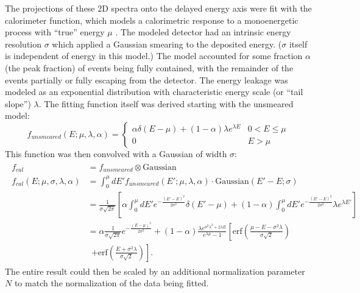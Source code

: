 The projections of these 2D spectra onto the delayed energy axis
were fit with the calorimeter function, which models
a calorimetric response to a monoenergetic process with ``true''
energy $\mu$ \cite{calorimeter2016}.
The modeled detector had an intrinsic energy resolution $\sigma$
which applied a Gaussian smearing to the deposited energy.
($\sigma$ itself is independent of energy in this model.)
The model accounted for some fraction $\alpha$ (the peak fraction)
of events being fully contained,
with the remainder of the events partially or fully escaping from the detector.
The energy leakage was modeled as an exponential distribution
with characteristic energy scale (or ``tail slope'') $\lambda$.
The fitting function itself was derived starting with
the unsmeared model:
\begin{equation}
    f_{unsmeared}(E;\mu,\lambda,\alpha) =
    \begin{cases}
        \alpha\delta(E-\mu) + (1-\alpha)\lambda e^{\lambda E}
        & 0 < E \leq \mu \\
        0 & E > \mu
    \end{cases}
\end{equation}
This function was then convolved with a Gaussian
of width $\sigma$:
\begin{align}
    \begin{split}
    f_{cal}    &= f_{unsmeared} \otimes \text{Gaussian} \\
    f_{cal}(E;\mu,\sigma,\lambda,\alpha) &= \int_0^\mu dE'
    f_{unsmeared}(E';\mu,\lambda,\alpha) \cdot \text{Gaussian}(E'-E; \sigma) \\
               &= \frac{1}{\sigma\sqrt{2\pi}}
               \left[
                   \alpha\int_0^\mu dE' e^{-\frac{(E'-E)^2}{2\sigma^2}} \delta(E'-\mu)
                   + (1-\alpha)\int_0^\mu dE' e^{-\frac{(E'-E)^2}{2\sigma^2}}
                   \lambda e^{\lambda E'}
               \right] \\
               &= \alpha\frac{1}{\sigma\sqrt{2\pi}}e^{-\frac{(E-\mu)^2}{2\sigma^2}}
               + (1-\alpha)
               \frac{\lambda e^{\sigma^2\lambda^2+2\lambda E}}{e^{\lambda\mu}-1}
               \left[
                   \text{erf}
                   \left(
                       \frac{\mu-E-\sigma^2\lambda}{\sigma\sqrt{2}}
                   \right)
                   \right. \\
               &\ \ \left.
                   + \text{erf}
                   \left(
                       \frac{E + \sigma^2\lambda}{\sigma\sqrt{2}}
                   \right)
               \right].
    \end{split}
\end{align}
The entire result could then be scaled
by an additional normalization parameter $N$
to match the normalization of the data being fitted.

